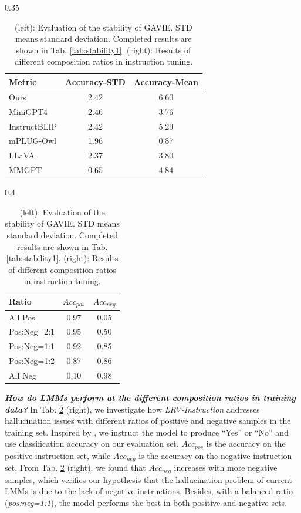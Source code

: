 \begin{table}[t]
\begin{subtable}[t]{0.35\textwidth}
\small
\begin{tabular}{lcc}
\toprule[1.5pt]
Metric& Accuracy-STD & Accuracy-Mean\\
\midrule
Ours& 2.42 & 6.60\\
MiniGPT4& 2.46 & 3.76\\
InstructBLIP& 2.42 & 5.29\\
mPLUG-Owl& 1.96 & 0.87\\
LLaVA& 2.37 & 3.80\\
MMGPT& 0.65 & 4.84\\
\bottomrule[1.5pt]
\end{tabular}
\end{subtable}
\hspace{1.1in}
\begin{subtable}[t]{0.4\textwidth}
\setlength\tabcolsep{4.7pt}
\centering
\small
\begin{tabular}{lcc}
\toprule[1.5pt]
Ratio & $Acc_{pos}$  & $Acc_{neg}$ \\
\midrule
All Pos & 0.97 & 0.05\\
Pos:Neg=2:1 & 0.95 & 0.50\\
Pos:Neg=1:1 & 0.92 & 0.85\\
Pos:Neg=1:2 & 0.87 & 0.86\\
All Neg & 0.10 & 0.98\\
\bottomrule[1.5pt]
\end{tabular}
\end{subtable}
\vspace{2mm}
\caption{(left): Evaluation of the stability of GAVIE. STD means standard deviation. Completed results are shown in Tab. \ref{tab:stability1}. (right): Results of different composition ratios in instruction tuning.}
\label{tab:experiments}
\vspace{-0.2in}
\end{table}

\textbf{\textit{How do LMMs perform at the different composition ratios in training data?}} In Tab. \ref{tab:experiments} (right), we investigate how \textit{LRV-Instruction} addresses hallucination issues with different ratios of positive and negative samples in the training set. Inspired by \citep{li2023evaluating}, we instruct the model to produce “Yes” or “No” and use classification accuracy on our evaluation set. \textit{$Acc_{pos}$} is the accuracy on the positive instruction set, while \textit{$Acc_{neg}$} is the accuracy on the negative instruction set. From Tab. \ref{tab:experiments} (right), we found that \textit{$Acc_{neg}$} increases with more negative samples, which verifies our hypothesis that the hallucination problem of current LMMs is due to the lack of negative instructions. Besides, with a balanced ratio (\textit{pos:neg=1:1}), the model performs the best in both positive and negative sets.

